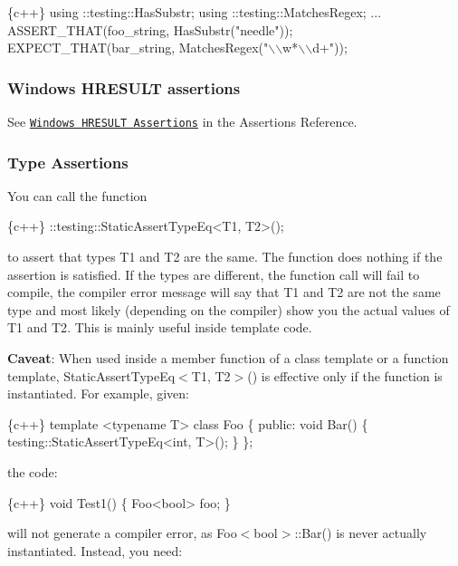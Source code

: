 \begin{DoxyCode}
\{c++\}
using ::testing::HasSubstr;
using ::testing::MatchesRegex;
...
  ASSERT\_THAT(foo\_string, HasSubstr("needle"));
  EXPECT\_THAT(bar\_string, MatchesRegex("\(\backslash\)\(\backslash\)w*\(\backslash\)\(\backslash\)d+"));
\end{DoxyCode}


\subsubsection*{Windows H\+R\+E\+S\+U\+LT assertions}

See \href{reference/assertions.md#HRESULT}{\tt Windows H\+R\+E\+S\+U\+LT Assertions} in the Assertions Reference.

\subsubsection*{Type Assertions}

You can call the function


\begin{DoxyCode}
\{c++\}
::testing::StaticAssertTypeEq<T1, T2>();
\end{DoxyCode}


to assert that types {\ttfamily T1} and {\ttfamily T2} are the same. The function does nothing if the assertion is satisfied. If the types are different, the function call will fail to compile, the compiler error message will say that {\ttfamily T1 and T2 are not the same type} and most likely (depending on the compiler) show you the actual values of {\ttfamily T1} and {\ttfamily T2}. This is mainly useful inside template code.

{\bfseries Caveat}\+: When used inside a member function of a class template or a function template, {\ttfamily Static\+Assert\+Type\+Eq$<$T1, T2$>$()} is effective only if the function is instantiated. For example, given\+:


\begin{DoxyCode}
\{c++\}
template <typename T> class Foo \{
 public:
  void Bar() \{ testing::StaticAssertTypeEq<int, T>(); \}
\};
\end{DoxyCode}


the code\+:


\begin{DoxyCode}
\{c++\}
void Test1() \{ Foo<bool> foo; \}
\end{DoxyCode}


will not generate a compiler error, as {\ttfamily Foo$<$bool$>$\+::\+Bar()} is never actually instantiated. Instead, you need\+:


